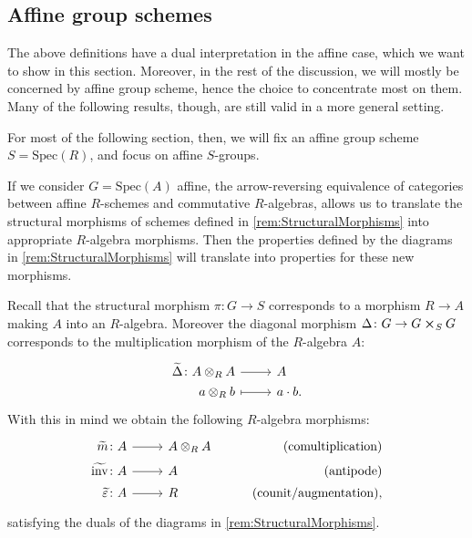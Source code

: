 \documentclass[../Main]{subfiles}
\begin{document}
\subsection{Affine group schemes}
The above definitions have a dual interpretation in the affine case,
which we want to show in this section.
Moreover, in the rest of the discussion, we will mostly be concerned by
affine group scheme, hence the choice to concentrate most on them.
Many of the following results, though, are still valid in a more general setting.

For most of the following section, then, we will fix an affine group scheme
$S = \mathrm{Spec}(R)$, and focus on affine $S$-groups.


\begin{rem}[]
If we consider $G = \mathrm{Spec}(A)$ affine, 
the arrow-reversing equivalence of categories between
affine $R$-schemes and commutative $R$-algebras, 
allows us to translate the structural morphisms
of schemes defined in \cref{rem:StructuralMorphisms} into
appropriate $R$-algebra morphisms.
Then the properties defined by the diagrams in \cref{rem:StructuralMorphisms}
will translate into properties for these new morphisms.

Recall that the structural morphism $\pi\colon G \to S$ corresponds to a
morphism $R \to A$ making $A$ into an $R$-algebra.
Moreover the diagonal morphism $\Delta\colon G \to G \cross_{ S } G$ corresponds
to the multiplication morphism of the $R$-algebra $A$:
\begin{equation*}
\begin{tikzcd}[row sep = 0ex
	,/tikz/column 1/.append style={anchor=base east}
	,/tikz/column 2/.append style={anchor=base west}]
	\widetilde{\Delta}\colon A \otimes_R A \arrow[r, "", rightarrow] &
	A \\
	a \otimes_R b \arrow[r, "", mapsto] & a \cdot b
.\end{tikzcd}
\end{equation*} 
With this in mind we obtain the following $R$-algebra morphisms:
\begin{equation*}
		\begin{tikzcd}[row sep = 0ex
 ,/tikz/column 1/.append style={anchor=base east}
 ,/tikz/column 2/.append style={anchor=base west}
 ,/tikz/column 3/.append style={anchor=base east}]
		\widetilde{m}\colon A \arrow[r, "", rightarrow] &
		A \otimes_R A & \text{(comultiplication)} \\
		\widetilde{\mathrm{inv}}\colon A \arrow[r, "", rightarrow] &
		A & \text{(antipode)} \\
		\widetilde{\varepsilon} \colon A \arrow[r, "", rightarrow] &
		R & \text{(counit/augmentation),}
	\end{tikzcd}
\end{equation*} 
satisfying the duals of the diagrams in \cref{rem:StructuralMorphisms}.
\end{rem}
\end{document}
